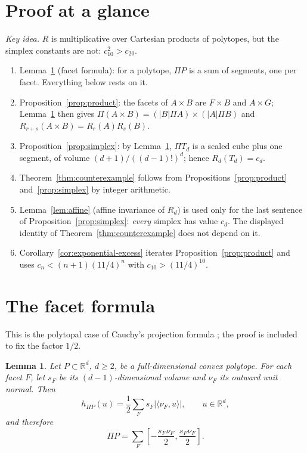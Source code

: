 \documentclass[11pt]{article}
\newtheorem{lemma}[theorem]{Lemma}
\newcommand{\R}{\mathbb R}
\begin{document}
\section{Proof at a glance}

\emph{Key idea.} \(R\) is multiplicative over Cartesian products of polytopes, but the simplex constants are not: \(c_{10}^2>c_{20}\).

\begin{enumerate}[nosep]
\item Lemma~\ref{lem:facets} (facet formula): for a polytope, \(\Pi P\) is a sum of segments, one per facet. Everything below rests on it.
\item Proposition~\ref{prop:product}: the facets of \(A\times B\) are \(F\times B\) and \(A\times G\); Lemma~\ref{lem:facets} then gives \(\Pi(A\times B)=(|B|\Pi A)\times(|A|\Pi B)\) and \(R_{r+s}(A\times B)=R_r(A)R_s(B)\).
\item Proposition~\ref{prop:simplex}: by Lemma~\ref{lem:facets}, \(\Pi T_d\) is a scaled cube plus one segment, of volume \((d+1)/((d-1)!)^d\); hence \(R_d(T_d)=c_d\).
\item Theorem~\ref{thm:counterexample} follows from Propositions~\ref{prop:product} and~\ref{prop:simplex} by integer arithmetic.
\item Lemma~\ref{lem:affine} (affine invariance of \(R_d\)) is used only for the last sentence of Proposition~\ref{prop:simplex}: \emph{every} simplex has value \(c_d\). The displayed identity of Theorem~\ref{thm:counterexample} does not depend on it.
\item Corollary~\ref{cor:exponential-excess} iterates Proposition~\ref{prop:product} and uses \(c_n<(n+1)(11/4)^n\) with \(c_{10}>(11/4)^{10}\).
\end{enumerate}

\section{The facet formula}\label{sec:facets}

This is the polytopal case of Cauchy's projection formula \cite[Section~1]{Saroglou}; the proof is included to fix the factor \(1/2\).

\begin{lemma}\label{lem:facets}
Let \(P\subset\R^d\), \(d\ge2\), be a full-dimensional convex polytope. For each facet
\(F\), let \(s_F\) be its \((d-1)\)-dimensional volume and \(\nu_F\) its
outward unit normal. Then
\begin{equation}\label{eq:facet}
 h_{\Pi P}(u)=\frac12\sum_Fs_F|\langle\nu_F,u\rangle|,
 \qquad u\in\R^d,
\end{equation}
and therefore
\begin{equation}\label{eq:zonotope}
 \Pi P=\sum_F
 \left[-\frac{s_F\nu_F}{2},\frac{s_F\nu_F}{2}\right].
\end{equation}
\end{lemma}
\end{document}
